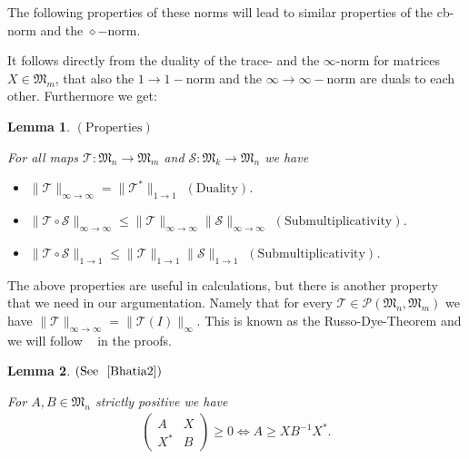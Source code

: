 \documentclass[a4paper
               ,12pt
               ,DIV=12
               ,oneside
               ]
               {amsart}
\theoremstyle{plain}
\newtheorem{lem}{Lemma}
\theoremstyle{remark}
\def\ra{\rightarrow}
\def\lb{\left(}
\def\rb{\right)}
\newcommand\M{\mathfrak{M}}
\newcommand{\Tm}{\mathcal{T}}
\newcommand{\Sm}{\mathcal{S}}
\newcommand{\Xst}{X}
\begin{document}
The following properties of these norms will lead to similar properties of the cb-norm and the $\diamond-$norm. 

It follows directly from the duality of the trace- and the $\infty$-norm for matrices $\Xst\in\M_m$, that also the $1\ra 1-$norm and the $\infty\ra\infty-$norm are duals to each other. Furthermore we get:  

\begin{lem}$\lb \text{Properties}\rb$

For all maps $\Tm :\M_n\ra\M_m$ and $\Sm:\M_k\ra\M_n$ we have

\begin{itemize}
\item $\| \Tm\|_{\infty\ra\infty} = \| \Tm^{*}\|_{1\ra 1}$ $\lb\text{Duality}\rb$.
\item $\| \Tm\circ \Sm\|_{\infty\ra\infty}\leq \| \Tm\|_{\infty\ra\infty}\| \Sm\|_{\infty\ra\infty}$ $\lb\text{Submultiplicativity}\rb$.
\item $\| \Tm\circ \Sm\|_{1\ra 1}\leq \| \Tm\|_{1\ra 1}\| \Sm\|_{1\ra 1}$ $\lb\text{Submultiplicativity}\rb$.
\end{itemize}

\end{lem}

The above properties are useful in calculations, but there is another property that we need in our argumentation. Namely that for every $\Tm\in\mathcal{P}\lb \M_n,\M_m\rb$ we have $\| \Tm\|_{\infty\ra\infty}=\| \Tm\lb I\rb\|_{\infty}$. This is known as the Russo-Dye-Theorem and we will follow ~\cite{Bhatia2} in the proofs.

\begin{lem}$\lb\text{See ~\cite{Bhatia2}}\rb$

For $A,B\in\M_n$ strictly positive we have
\begin{align*}
\begin{pmatrix} A & X \\ X^{*} & B \end{pmatrix} \geq 0 \Longleftrightarrow A\geq XB^{-1}X^{*}.
\end{align*}
\label{lem:positivity}
\end{lem}
\end{document}
